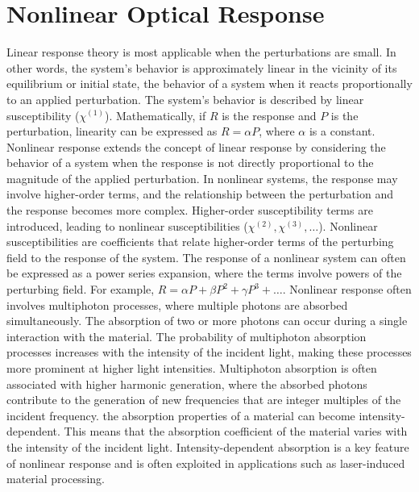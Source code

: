 \section{Nonlinear Optical Response}
 Linear response theory is most applicable when the perturbations are small. In other words, the system's behavior is approximately linear in the vicinity of its equilibrium or initial state, the behavior of a system when it reacts proportionally to an applied perturbation.
The system's behavior is described by linear susceptibility ($\chi^{(1)}$). Mathematically, if $R$ is the response and $P$ is the perturbation, linearity can be expressed as $R = \alpha P$, where $\alpha$ is a constant. 
Nonlinear response extends the concept of linear response by considering the behavior of a system when the response is not directly proportional to the magnitude of the applied perturbation. In nonlinear systems, the response may involve higher-order terms, and the relationship between the perturbation and the response becomes more complex. Higher-order susceptibility terms are introduced, leading to nonlinear susceptibilities ($\chi^{(2)}, \chi^{(3)}, \ldots$). Nonlinear susceptibilities are coefficients that relate higher-order terms of the perturbing field to the response of the system. The response of a nonlinear system can often be expressed as a power series expansion, where the terms involve powers of the perturbing field. For example, $R = \alpha P + \beta P^2 + \gamma P^3 + \ldots$.
Nonlinear response often involves multiphoton processes, where multiple photons are absorbed simultaneously.  The absorption of two or more photons can occur during a single interaction with the material. The probability of multiphoton absorption processes increases with the intensity of the incident light, making these processes more prominent at higher light intensities.
Multiphoton absorption is often associated with higher harmonic generation, where the absorbed photons contribute to the generation of new frequencies that are integer multiples of the incident frequency. 
the absorption properties of a material can become intensity-dependent. This means that the absorption coefficient of the material varies with the intensity of the incident light.
Intensity-dependent absorption is a key feature of nonlinear response and is often exploited in applications such as laser-induced material processing.

